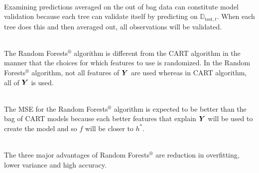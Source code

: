 \documentclass[12pt]{article}
\begin{document}
\begin{enumerate}
 \\
Examining predictions averaged on the out of bag data can constitute model validation because each tree can validate itself by predicting on $\mathbb{D}_{\text{test}, t}$. When each tree does this and then averaged out, all observations will be validated. 


 \\
The Random Forests$^\circledR$ algorithm is different from the CART algorithm in the manner that the choices for which features to use is randomized. In the Random Forests$^\circledR$ algorithm, not all features of $\boldsymbol{Y}$ are used whereas in CART algorithm, all of $\boldsymbol{Y}$ is used. 

 \\
The MSE for the Random Forests$^\circledR$ algorithm is expected to be better than the bag of CART models because each better features that explain $\boldsymbol{Y}$ will be used to create the model and so $f$ will be closer to $h^*$.

 \\
The three major advantages of Random Forests$^\circledR$ are reduction in overfitting, lower variance and high accuracy. 

\end{enumerate}

\end{document}
